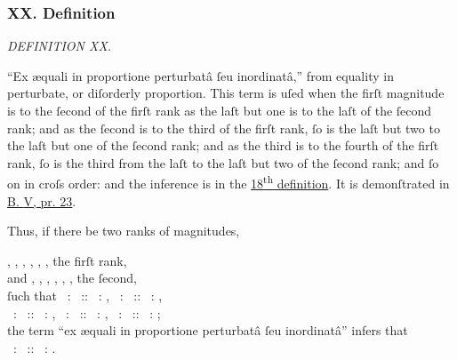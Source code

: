 \documentclass[11pt,preview]{standalone}
\begin{document}
\newcommand{\redA}{{\color{cred}{A}}}
\newcommand{\redB}{{\color{cred}{B}}}
\newcommand{\redP}{{\color{cred}{P}}}
\newcommand{\redQ}{{\color{cred}{Q}}}
\newcommand{\blueC}{{\color{cblue}{C}}}
\newcommand{\blueD}{{\color{cblue}{D}}}
\newcommand{\blueN}{{\color{cblue}{N}}}
\newcommand{\blueO}{{\color{cblue}{O}}}
\newcommand{\yellowE}{{\color{cyellow}{E}}}
\newcommand{\yellowF}{{\color{cyellow}{F}}}
\newcommand{\yellowL}{{\color{cyellow}{L}}}
\newcommand{\yellowM}{{\color{cyellow}{M}}}

\subsubsection{XX. Definition}

\begin{minipage}{\textwidth}

    \begin{center}
        \textit{DEFINITION XX.}\label{book5def20} \\
    \end{center}

    \hfill
\end{minipage}

\raggedright “Ex \ae quali in proportione perturbatâ ſeu inordinatâ,” from equality in perturbate, or diſorderly proportion. This term is uſed when the firſt magnitude is to the ſecond of the firſt rank as the laſt but one is to the laſt of the ſecond rank; and as the ſecond is to the third of the firſt rank, ſo is the laſt but two to the laſt but one of the ſecond rank; and as the third is to the fourth of the firſt rank, ſo is the third from the laſt to the laſt but two of the ſecond rank; and ſo on in croſs order: and the inference is in the \hyperref[book5def18]{18\textsuperscript{th} definition}. It is demonſtrated in \hyperref[book5pr23]{B. \textsc{V}, pr. 23}.

\hfill

Thus, if there be two ranks of magnitudes,\\

\begin{center}
    \redA, \redB, \blueC, \blueD, \yellowE, \yellowF, the firſt rank,\\
    and \yellowL, \yellowM, \blueN, \blueO, \redP, \redQ, the ſecond,\\
    ſuch that \redA\ : \redB\ :: \redP\ : \redQ, \redB\ : \blueC\ :: \blueO\ : \redP,\\
    \blueC\ : \blueD\ :: \blueN\ : \blueO, \blueD\ : \yellowE\ :: \yellowM\ : \blueN, \yellowE\ : \yellowF\ :: \yellowL\ : \yellowM;\\
    the term “ex æquali in proportione perturbatâ ſeu inordinatâ” infers that\\
    \redA\ : \yellowF\ :: \yellowL\ : \redQ.
\end{center}
\end{document}
